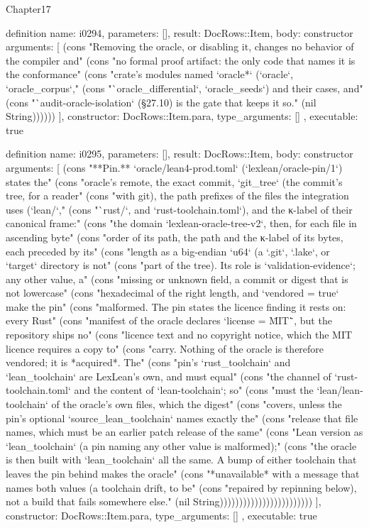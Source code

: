 \begin{lexlean}{Chapter17}
\begin{semanticmodule}
definition{
  name: i0294,
  parameters: [],
  result: DocRows::Item,
  body: constructor{
    arguments: [
      (cons "Removing the oracle, or disabling it, changes no behavior of the compiler and" (cons "no formal proof artifact: the only code that names it is the conformance" (cons "crate's modules named `oracle*` (`oracle`, `oracle_corpus`," (cons "`oracle_differential`, `oracle_seeds`) and their cases, and" (cons "`audit-oracle-isolation` (§27.10) is the gate that keeps it so." (nil String))))))
    ],
    constructor: DocRows::Item.para,
    type_arguments: []
  },
  executable: true
}

definition{
  name: i0295,
  parameters: [],
  result: DocRows::Item,
  body: constructor{
    arguments: [
      (cons "**Pin.** `oracle/lean4-prod.toml` (`lexlean/oracle-pin/1`) states the" (cons "oracle's remote, the exact commit, `git_tree` (the commit's tree, for a reader" (cons "with git), the path prefixes of the files the integration uses (`lean/`," (cons "`rust/`, and `rust-toolchain.toml`), and the κ-label of their canonical frame:" (cons "the domain `lexlean-oracle-tree-v2`, then, for each file in ascending byte" (cons "order of its path, the path and the κ-label of its bytes, each preceded by its" (cons "length as a big-endian `u64` (a `.git`, `.lake`, or `target` directory is not" (cons "part of the tree). Its role is `validation-evidence`; any other value, a" (cons "missing or unknown field, a commit or digest that is not lowercase" (cons "hexadecimal of the right length, and `vendored = true` make the pin" (cons "malformed. The pin states the licence finding it rests on: every Rust" (cons "manifest of the oracle declares `license = \"MIT\"`, but the repository ships no" (cons "licence text and no copyright notice, which the MIT licence requires a copy to" (cons "carry. Nothing of the oracle is therefore vendored; it is *acquired*. The" (cons "pin's `rust_toolchain` and `lean_toolchain` are LexLean's own, and must equal" (cons "the channel of `rust-toolchain.toml` and the content of `lean-toolchain`; so" (cons "must the `lean/lean-toolchain` of the oracle's own files, which the digest" (cons "covers, unless the pin's optional `source_lean_toolchain` names exactly the" (cons "release that file names, which must be an earlier patch release of the same" (cons "Lean version as `lean_toolchain` (a pin naming any other value is malformed);" (cons "the oracle is then built with `lean_toolchain` all the same. A bump of either toolchain that leaves the pin behind makes the oracle" (cons "*unavailable* with a message that names both values (a toolchain drift, to be" (cons "repaired by repinning below), not a build that fails somewhere else." (nil String))))))))))))))))))))))))
    ],
    constructor: DocRows::Item.para,
    type_arguments: []
  },
  executable: true
}


\end{semanticmodule}
\end{lexlean}
